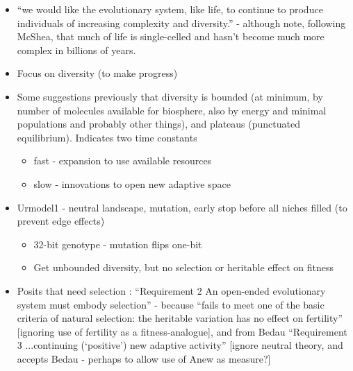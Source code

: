 		\begin{itemize}
			\item
			
			``we would like the evolutionary system, like life, to continue to
			produce individuals of increasing complexity and diversity.'' -
			although note, following McShea, that much of life is single-celled
			and hasn't become much more complex in billions of years.
			
			\item
			
			Focus on diversity (to make progress)
			
			\item
			
			Some suggestions previously that diversity is bounded (at minimum, by
			number of molecules available for biosphere, also by energy and
			minimal populations and probably other things), and plateaus
			(punctuated equilibrium). Indicates two time constants
			
			
			\begin{itemize}
				\item
				
				fast - expansion to use available resources
				
				\item
				
				slow - innovations to open new adaptive space
				
			\end{itemize}
			\item
			
			Urmodel1 - neutral landscape, mutation, early stop before all niches
			filled (to prevent edge effects)
			
			
			\begin{itemize}
				\item
				
				32-bit genotype - mutation flips one-bit
				
				\item
				
				Get unbounded diversity, but no selection or heritable effect on
				fitness
				
			\end{itemize}
			\item
			
			Posits that need selection : ``Requirement 2 An open-ended
			evolutionary system must embody selection'' - because ``fails to meet
			one of the basic criteria of natural selection: the heritable
			variation has no effect on fertility'' {[}ignoring use of fertility as
			a fitness-analogue{]}, and from Bedau ``Requirement 3 ...continuing
			(`positive') new adaptive activity'' {[}ignore neutral theory, and
			accepts Bedau - perhaps to allow use of Anew as measure?{]}
			

\end{itemize}
